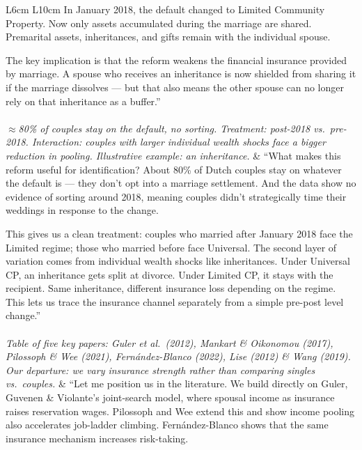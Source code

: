 \documentclass[11pt, a4paper]{article}
\begin{document}
\begin{longtable}{L{6cm} L{10cm}}
In January 2018, the default changed to Limited Community Property. Now only assets accumulated during the marriage are shared. Premarital assets, inheritances, and gifts remain with the individual spouse.

The key implication is that the reform weakens the financial insurance provided by marriage. A spouse who receives an inheritance is now shielded from sharing it if the marriage dissolves — but that also means the other spouse can no longer rely on that inheritance as a buffer.'' \\[1em]

\\
\textit{$\approx$80\% of couples stay on the default, no sorting.
Treatment: post-2018 vs.\ pre-2018.
Interaction: couples with larger individual wealth shocks face a bigger reduction in pooling.
Illustrative example: an inheritance.} &
``What makes this reform useful for identification? About 80\% of Dutch couples stay on whatever the default is — they don't opt into a marriage settlement. And the data show no evidence of sorting around 2018, meaning couples didn't strategically time their weddings in response to the change.

This gives us a clean treatment: couples who married after January 2018 face the Limited regime; those who married before face Universal. The second layer of variation comes from individual wealth shocks like inheritances. Under Universal CP, an inheritance gets split at divorce. Under Limited CP, it stays with the recipient. Same inheritance, different insurance loss depending on the regime. This lets us trace the insurance channel separately from a simple pre-post level change.'' \\[1em]

\\
\textit{Table of five key papers: Guler et al.\ (2012), Mankart \& Oikonomou (2017), Pilossoph \& Wee (2021), Fern\'andez-Blanco (2022), Lise (2012) \& Wang (2019).
Our departure: we vary insurance strength rather than comparing singles vs.\ couples.} &
``Let me position us in the literature. We build directly on Guler, Guvenen \& Violante's joint-search model, where spousal income as insurance raises reservation wages. Pilossoph and Wee extend this and show income pooling also accelerates job-ladder climbing. Fernández-Blanco shows that the same insurance mechanism increases risk-taking.


\end{longtable}
\end{document}
